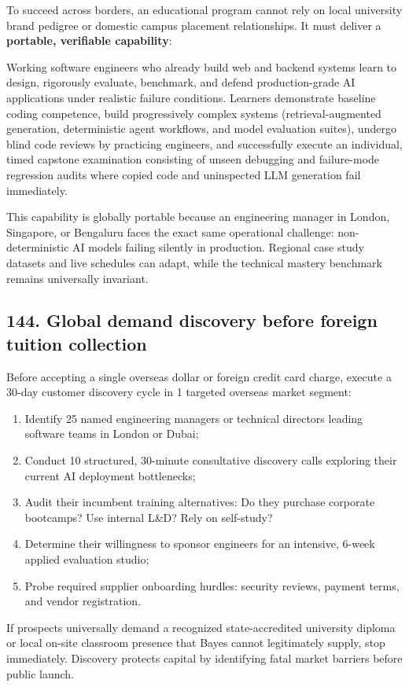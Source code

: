 To succeed across borders, an educational program cannot rely on local university brand pedigree or domestic campus placement relationships. It must deliver a \textbf{portable, verifiable capability}:
\begin{tcolorbox}[colback=BayesCanvas,colframe=BayesTeal,arc=1mm,title=\textbf{The Portable Capability Promise: Applied AI Systems Reliability}]
Working software engineers who already build web and backend systems learn to design, rigorously evaluate, benchmark, and defend production-grade AI applications under realistic failure conditions. Learners demonstrate baseline coding competence, build progressively complex systems (retrieval-augmented generation, deterministic agent workflows, and model evaluation suites), undergo blind code reviews by practicing engineers, and successfully execute an individual, timed capstone examination consisting of unseen debugging and failure-mode regression audits where copied code and uninspected LLM generation fail immediately.
\end{tcolorbox}
This capability is globally portable because an engineering manager in London, Singapore, or Bengaluru faces the exact same operational challenge: non-deterministic AI models failing silently in production. Regional case study datasets and live schedules can adapt, while the technical mastery benchmark remains universally invariant.

\subsection{144. Global demand discovery before foreign tuition collection}

Before accepting a single overseas dollar or foreign credit card charge, execute a 30-day customer discovery cycle in 1 targeted overseas market segment:
\begin{enumerate}
    \item Identify 25 named engineering managers or technical directors leading software teams in London or Dubai;
    \item Conduct 10 structured, 30-minute consultative discovery calls exploring their current AI deployment bottlenecks;
    \item Audit their incumbent training alternatives: Do they purchase corporate bootcamps? Use internal L\&D? Rely on self-study?
    \item Determine their willingness to sponsor engineers for an intensive, 6-week applied evaluation studio;
    \item Probe required supplier onboarding hurdles: security reviews, payment terms, and vendor registration.
\end{enumerate}
If prospects universally demand a recognized state-accredited university diploma or local on-site classroom presence that Bayes cannot legitimately supply, stop immediately. Discovery protects capital by identifying fatal market barriers before public launch.

